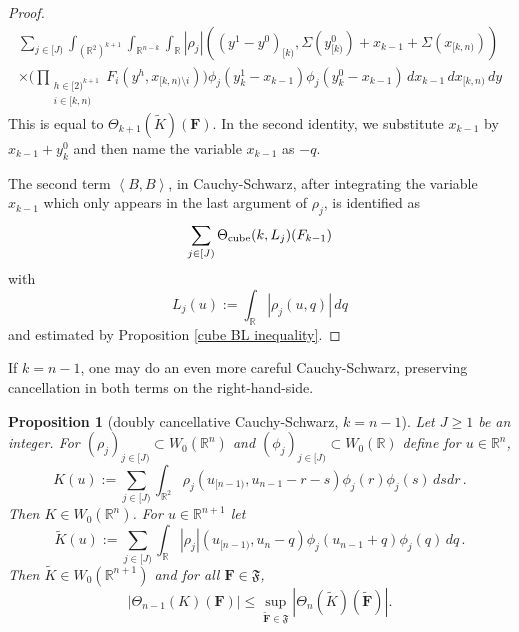 \documentclass[12pt,reqno]{amsart}
\theoremstyle{plain}
\newtheorem{proposition}[theorem]{Proposition}
\numberwithin{equation}{section}
\theoremstyle{remark}
\newcommand{\R}{{\mathbb R}}
\newcommand{\F}{\mathbf{F}}
\begin{document}
\begin{proof}
\begin{equation}
\begin{aligned}
\sum_{j\in[J)}\int_{(\R^2)^{k+1}}\int_{\R^{n-k}}
\int_\R
|\rho_j|((y^1-y^0)_{[k)},\Sigma(y^0_{[k)})+x_{k-1}+\Sigma(x_{[k,n)}))
\\
\times
\Big(
\prod_{\substack{h\in[2)^{k+1}\\ i\in[k,n)}}
F_{i}(y^h,x_{[k,n)\setminus i})
\Big)
\phi_j(y_k^1-x_{k-1})\phi_j(y_k^0-x_{k-1})
\,dx_{k-1}\,dx_{[k,n)}\,dy
\end{aligned}
\end{equation}
This is equal to $\Theta_{k+1}(\tilde{K})(\F)$.
In the second identity, we substitute
$x_{k-1}$ by $x_{k-1}+y_k^0$ and then name the variable $x_{k-1}$ as $-q$.

The second term $\left< B , B \right>$, in Cauchy-Schwarz, after integrating the variable $x_{k-1}$ which only appears in the last argument of $\rho_j$,
is identified as
\begin{equation}
    \sum_{j\in[J)} \Theta_{\rm cube}(k,L_j)(F_{k-1})
\end{equation}
with
\begin{equation}
    L_j(u):=\int_\R |\rho_j(u,q)|\,dq
\end{equation}
and estimated by Proposition \ref{cube BL inequality}.
\end{proof}


If $k=n-1$, one may do an even more careful Cauchy-Schwarz, preserving cancellation in both terms on the right-hand-side.


\begin{proposition}[doubly cancellative Cauchy-Schwarz, $k=n-1$]\label{doubly cancellative Cauchy-Schwarz}
Let $J\ge 1$ be an integer. For $(\rho_j)_{j\in[J)}\subset W_0(\R^n)$ and
$(\phi_j)_{j\in [J)}\subset W_0(\R)$ define for $u\in \R^n$,
\begin{equation}\label{auto:Cauchy-Schwarz-terminal-kernel-K}
    K(u):=\sum_{j\in [J)}\int_{\R^2} \rho_j(u_{[n-1)}, u_{n-1}-r-s) \phi_j(r) \phi_j(s) \, ds dr\, .
\end{equation}
Then $K\in W_0(\R^n)$.
For $u\in\R^{n+1}$ let
\begin{equation}\label{auto:Cauchy-Schwarz-terminal-kernel-tilde-K}
    \tilde{K}(u):=\sum_{j\in [J)}\int_\R |\rho_j|(u_{[n-1)}, u_{n}-q) \phi_j(u_{n-1}+q) \phi_j(q) \, dq\, .
\end{equation}
Then $\tilde{K}\in W_0(\R^{n+1})$ and for all $\F\in\mathfrak{F}$,
\begin{equation}\label{auto:Cauchy-Schwarz-at-n-minus-one-bound}
    |\Theta_{n-1}(K)(\F)| \le \sup_{\mathbf{\tilde{F}}\in\mathfrak{F}} |\Theta_{n}(\tilde{K})(\mathbf{\tilde{F}})|.
\end{equation}
\end{proposition}
\end{document}
